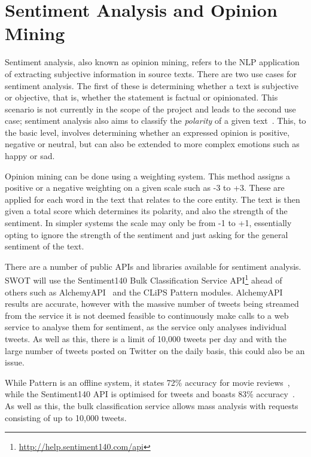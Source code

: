 \section[Sentiment Analysis]{Sentiment Analysis and Opinion Mining}
\label{sec:back_sent}
Sentiment analysis, also known as opinion mining, refers to the NLP application of extracting subjective information in source texts. There are two use cases for sentiment analysis. The first of these is determining whether a text is subjective or objective, that is, whether the statement is factual or opinionated. This scenario is not currently in the scope of the project and leads to the second use case; sentiment analysis also aims to classify the \emph{polarity} of a given text~\cite{Pang+Lee}. This, to the basic level, involves determining whether an expressed opinion is positive, negative or neutral, but can also be extended to more complex emotions such as happy or sad.

Opinion mining can be done using a weighting system. This method assigns a positive or a negative weighting on a given scale such as -3 to +3. These are applied for each word in the text that relates to the core entity. The text is then given a total score which determines its polarity, and also the strength of the sentiment. In simpler systems the scale may only be from -1 to +1, essentially opting to ignore the strength of the sentiment and just asking for the general sentiment of the text.

There are a number of public APIs and libraries available for sentiment analysis. SWOT will use the Sentiment140 Bulk Classification Service API\footnote{\url{http://help.sentiment140.com/api}} ahead of others such as AlchemyAPI~\cite{alchemyapi} and the CLiPS Pattern modules. 
AlchemyAPI results are accurate, however with the massive number of tweets being streamed from the service it is not deemed feasible to continuously make calls to a web service to analyse them for sentiment, as the service only analyses individual tweets. As well as this, there is a limit of 10,000 tweets per day and with the large number of tweets posted on Twitter on the daily basis, this could also be an issue.

While Pattern is an offline system, it states 72\% accuracy for movie reviews~\cite{pattern}, while the Sentiment140 API is optimised for tweets and boasts 83\% accuracy~\cite{Go_Bhayani_Huang_2009}. As well as this, the bulk classification service allows mass analysis with requests consisting of up to 10,000 tweets.

